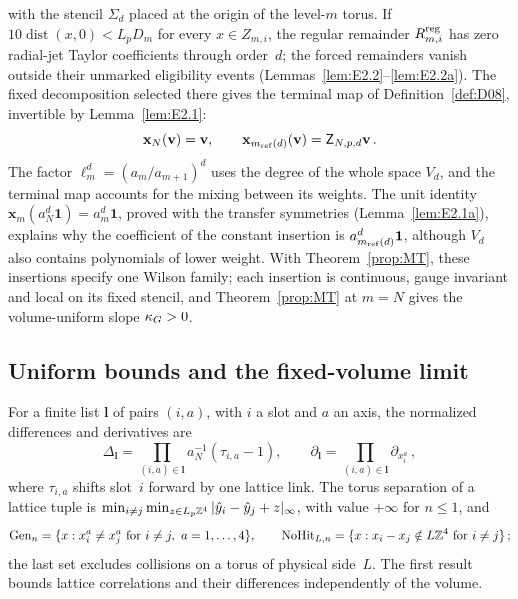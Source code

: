 with the stencil $\Sigma_d$ placed at the origin of the level-$m$ torus. If $10\operatorname{dist}(x,0)<L_pD_m$ for every $x\in Z_{m,i}$, the regular remainder $R_{m,i}^{\rm reg}$ has zero radial-jet Taylor coefficients through order~$d$; the forced remainders vanish outside their unmarked eligibility events (Lemmas~\ref{lem:E2.2}--\ref{lem:E2.2a}). The fixed decomposition selected there gives the terminal map of Definition~\ref{def:D08}, invertible by Lemma~\ref{lem:E2.1}:
\begin{equation*}
\mathbf x_N(\mathbf v)=\mathbf v,\qquad
\mathbf x_{m_{\mathrm{ref}}(d)}(\mathbf v)=\mathsf Z_{N,p,d}\mathbf v\,.
\end{equation*}
The factor $\ell_m^d=(a_m/a_{m+1})^d$ uses the degree of the whole space $V_d$, and the terminal map accounts for the mixing between its weights. The unit identity $\mathbf x_m(a_N^d\mathbf1)=a_m^d\mathbf1$, proved with the transfer symmetries (Lemma~\ref{lem:E2.1a}), explains why the coefficient of the constant insertion is $a_{m_{\mathrm{ref}}(d)}^d\mathbf1$, although $V_d$ also contains polynomials of lower weight. With Theorem~\ref{prop:MT}, these insertions specify one Wilson family; each insertion is continuous, gauge invariant and local on its fixed stencil, and Theorem~\ref{prop:MT} at $m=N$ gives the volume-uniform slope $\kappa_G>0$.

\subsection{Uniform bounds and the fixed-volume limit}\label{sec:uv-limit}

For a finite list $\boldsymbol l$ of pairs $(i,a)$, with $i$ a slot and $a$ an axis, the normalized differences and derivatives are
\begin{equation*}
\Delta_{\boldsymbol l}=\prod_{(i,a)\in\boldsymbol l}a_N^{-1}(\tau_{i,a}-1),\qquad
\partial_{\boldsymbol l}=\prod_{(i,a)\in\boldsymbol l}\partial_{x_i^a}\,,
\end{equation*}
where $\tau_{i,a}$ shifts slot~$i$ forward by one lattice link. The torus separation of a lattice tuple is $\min_{i\ne j}\min_{z\in L_p\mathbb{Z}^4}|\hat y_i-\hat y_j+z|_\infty$, with value $+\infty$ for $n\le1$, and
\begin{equation*}
\mathrm{Gen}_{n}=\{x:x_i^a\ne x_j^a\text{ for }i\ne j,\ a=1,\ldots,4\},\qquad
\mathrm{NoHit}_{L,n}=\{x:x_i-x_j\notin L\mathbb{Z}^4\text{ for }i\ne j\}\,;
\end{equation*}
the last set excludes collisions on a torus of physical side~$L$. The first result bounds lattice correlations and their differences independently of the volume.

